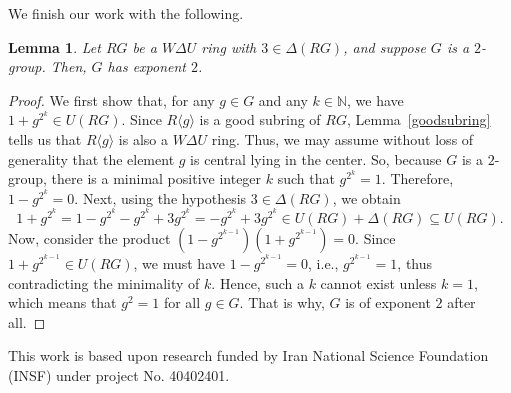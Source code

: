 \documentclass[12pt]{amsart}
\newtheorem{lemma}[theorem]{Lemma}
\theoremstyle{definition}
\begin{document}
We finish our work with the following.

\begin{lemma}
Let \(RG\) be a \(W\Delta U\) ring with \(3 \in \Delta(RG)\), and suppose \(G\) is a \(2\)-group. Then, \(G\) has exponent \(2\).
\end{lemma}

\begin{proof}
We first show that, for any \(g \in G\) and any \(k \in \mathbb{N}\), we have \(1 + g^{2^k} \in U(RG)\). Since \(R\langle g \rangle\) is a good subring of \(RG\), Lemma~\ref{goodsubring} tells us that \(R\langle g \rangle\) is also a \(W\Delta U\) ring. Thus, we may assume without loss of generality that the element \(g\) is central lying in the center. So, because \(G\) is a \(2\)-group, there is a minimal positive integer \(k\) such that \(g^{2^k} = 1\). Therefore, \(1 - g^{2^k} = 0\). Next, using the hypothesis \(3 \in \Delta(RG)\), we obtain
	\[
	1 + g^{2^k} = 1 - g^{2^k} - g^{2^k} + 3g^{2^k} = -g^{2^k} + 3g^{2^k} \in U(RG) + \Delta(RG) \subseteq U(RG).
	\]
Now, consider the product \((1 - g^{2^{k-1}})(1 + g^{2^{k-1}}) = 0\). Since \(1 + g^{2^{k-1}} \in U(RG)\), we must have \(1 - g^{2^{k-1}} = 0\), i.e., \(g^{2^{k-1}} = 1\), thus contradicting the minimality of \(k\). Hence, such a \(k\) cannot exist unless \(k = 1\), which means that \(g^2 = 1\) for all \(g \in G\). That is why, \(G\) is of exponent \(2\) after all.
\end{proof}

\bigskip

 This work is based upon research funded by Iran National Science Foundation (INSF) under project No. 40402401.

\vskip4.0pc
\end{document}
